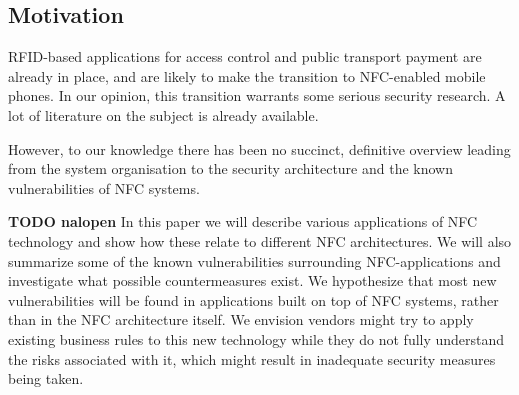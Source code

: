 
\subsection{Motivation}
RFID-based applications for access control and public transport payment are already in place, and are likely to make the transition to NFC-enabled mobile phones.
In our opinion, this transition warrants some serious security research.
A lot of literature on the subject is already available.

However, to our knowledge there has been no succinct, definitive overview leading from the system organisation to the security architecture and the known vulnerabilities of NFC systems.



\textbf{TODO nalopen}
In this paper we will describe various applications of NFC technology and show how these relate to different NFC architectures.
We will also summarize some of the known vulnerabilities surrounding NFC-applications and investigate what possible countermeasures exist.
We hypothesize that most new vulnerabilities will be found in applications built on top of NFC systems, rather than in the NFC architecture itself.
We envision vendors might try to apply existing business rules to this new technology while they do not fully understand the risks associated with it, which might result in inadequate security measures being taken.



